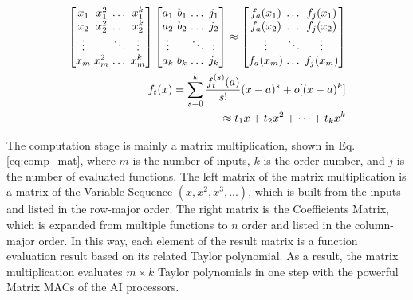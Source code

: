 \documentclass[12pt]{extbook}
\begin{document}
\begin{equation}
    \label{eq:comp_mat}
    \begin{aligned}
    \setlength{\arraycolsep}{1.5pt}
        \begin{bmatrix} 
            x_1    & x_1^2  &   \dots   & x_1^k  \\
            x_2    & x_2^2  &   \dots   & x_2^k  \\
            \vdots &        & \ddots    & \vdots \\
            x_m    & x_m^2  &   \dots   & x_m^k  
        \end{bmatrix}
        \begin{bmatrix} 
            a_1    & b_1    &   \dots   & j_1 \\
            a_2    & b_2    &   \dots   & j_2  \\
            \vdots &        & \ddots    & \vdots \\
            a_k    & b_k    &   \dots   & j_k  
        \end{bmatrix}
        \approx
        \begin{bmatrix}
            f_{a}(x_1)  &     \dots   & f_{j}(x_1)    \\
            f_{a}(x_2)  &     \dots   & f_{j}(x_2)    \\
            \vdots      & \ddots    & \vdots        \\
            f_{a}(x_m)  &   \dots   & f_{j}(x_m)
        \end{bmatrix} \\
        f_t(x) = \sum_{s = 0}^{k}\frac{f_t^{(s)}(a)}{s!}(x - a)^s + o[(x - a) ^ k] \\
        \approx t_1x + t_2x^2 + \dots + t_kx^k
    \end{aligned}
    \end{equation}

The computation stage is mainly a matrix multiplication, shown in Eq. \ref{eq:comp_mat}, where $m$ is the number of inputs, $k$ is the order number, and $j$ is the number of evaluated functions. The left matrix of the matrix multiplication is a matrix of the Variable Sequence $(x, x^2, x^3, ...)$, which is built from the inputs and listed in the row-major order. The right matrix is the Coefficients Matrix, which is expanded from multiple functions to $n$ order and listed in the column-major order. In this way, each element of the result matrix is a function evaluation result based on its related Taylor polynomial. As a result, the matrix multiplication evaluates $m \times k$ Taylor polynomials in one step with the powerful Matrix MACs of the AI processors. 
\end{document}

